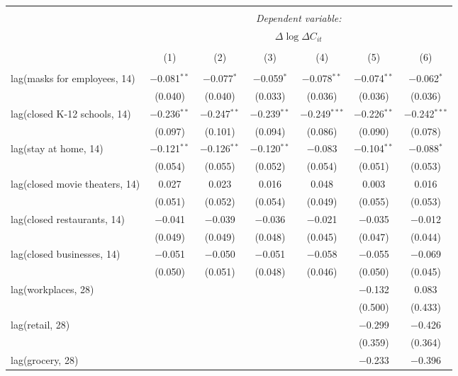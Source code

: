 \begin{tabular}{@{\extracolsep{1pt}}lcccccc} 
\\[-1.8ex]\hline 
\hline \\[-1.8ex] 
 & \multicolumn{6}{c}{\textit{Dependent variable:}} \\ 
\cline{2-7} 
 & \multicolumn{6}{c}{$\Delta \log \Delta C_{it}$} \\ 
\\[-1.8ex] & (1) & (2) & (3) & (4) & (5) & (6)\\ 
\hline \\[-1.8ex] 
 lag(masks for employees, 14) & $-$0.081$^{**}$ & $-$0.077$^{*}$ & $-$0.059$^{*}$ & $-$0.078$^{**}$ & $-$0.074$^{**}$ & $-$0.062$^{*}$ \\ 
  & (0.040) & (0.040) & (0.033) & (0.036) & (0.036) & (0.036) \\ 
  lag(closed K-12 schools, 14) & $-$0.236$^{**}$ & $-$0.247$^{**}$ & $-$0.239$^{**}$ & $-$0.249$^{***}$ & $-$0.226$^{**}$ & $-$0.242$^{***}$ \\ 
  & (0.097) & (0.101) & (0.094) & (0.086) & (0.090) & (0.078) \\ 
  lag(stay at home, 14) & $-$0.121$^{**}$ & $-$0.126$^{**}$ & $-$0.120$^{**}$ & $-$0.083 & $-$0.104$^{**}$ & $-$0.088$^{*}$ \\ 
  & (0.054) & (0.055) & (0.052) & (0.054) & (0.051) & (0.053) \\ 
  lag(closed movie theaters, 14) & 0.027 & 0.023 & 0.016 & 0.048 & 0.003 & 0.016 \\ 
  & (0.051) & (0.052) & (0.054) & (0.049) & (0.055) & (0.053) \\ 
  lag(closed restaurants, 14) & $-$0.041 & $-$0.039 & $-$0.036 & $-$0.021 & $-$0.035 & $-$0.012 \\ 
  & (0.049) & (0.049) & (0.048) & (0.045) & (0.047) & (0.044) \\ 
  lag(closed businesses, 14) & $-$0.051 & $-$0.050 & $-$0.051 & $-$0.058 & $-$0.055 & $-$0.069 \\ 
  & (0.050) & (0.051) & (0.048) & (0.046) & (0.050) & (0.045) \\ 
  lag(workplaces, 28) &  &  &  &  & $-$0.132 & 0.083 \\ 
  &  &  &  &  & (0.500) & (0.433) \\ 
  lag(retail, 28) &  &  &  &  & $-$0.299 & $-$0.426 \\ 
  &  &  &  &  & (0.359) & (0.364) \\ 
  lag(grocery, 28) &  &  &  &  & $-$0.233 & $-$0.396 \\ 

\end{tabular}
